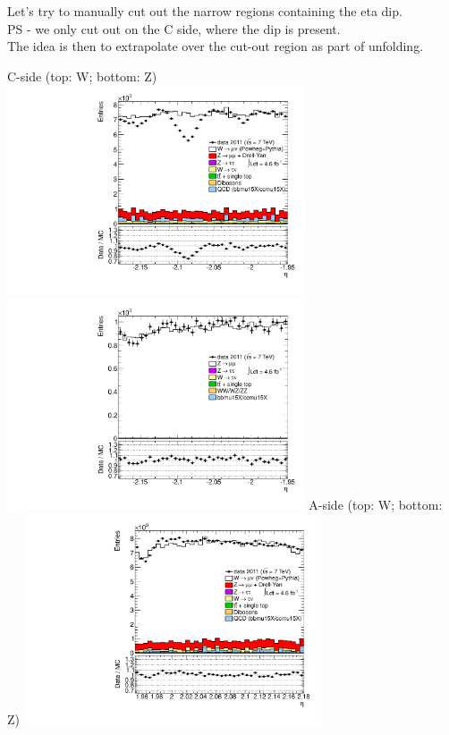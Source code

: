 \begin{frame}[label=CUTOUT]
Let's try to manually cut out the narrow regions containing the eta dip. \\
PS - we only cut out on the C side, where the dip is present. \\
The idea is then to extrapolate over the cut-out region as part of unfolding.
\end{frame}
 {
\colb[T]
C-side (top: W; bottom: Z)
\centering
\includegraphics[width=0.66\textwidth]{dates/20130306/figures/wfix/WNOM_10_C_stack_l_eta_NEG} \\
\includegraphics[width=0.66\textwidth]{dates/20130306/figures/both/Z_10_C_stack_lN_eta_ALL.pdf}
A-side (top: W; bottom: Z)
\centering
\includegraphics[width=0.66\textwidth]{dates/20130306/figures/wfix/WNOM_10_A_stack_l_eta_NEG} \\
}
